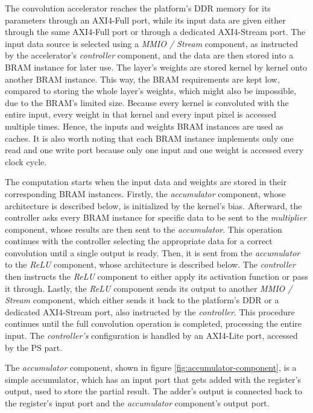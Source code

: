 The convolution accelerator reaches the platform's DDR memory for its parameters through an AXI4-Full port, while its input data are given either through the same AXI4-Full port or through a dedicated AXI4-Stream port. The input data source is selected using a \emph{MMIO / Stream} component, as instructed by the accelerator's \emph{controller} component, and the data are then stored into a BRAM instance for later use. The layer's weights are stored kernel by kernel onto another BRAM instance. This way, the BRAM requirements are kept low, compared to storing the whole layer's weights, which might also be impossible, due to the BRAM's limited size. Because every kernel is convoluted with the entire input, every weight in that kernel and every input pixel is accessed multiple times. Hence, the inputs and weights BRAM instances are used as caches. It is also worth noting that each BRAM instance implements only one read and one write port because only one input and one weight is accessed every clock cycle.

The computation starts when the input data and weights are stored in their corresponding BRAM instances. Firstly, the \emph{accumulator} component, whose architecture is described below, is initialized by the kernel's bias. Afterward, the controller asks every BRAM instance for specific data to be sent to the \emph{multiplier} component, whose results are then sent to the \emph{accumulator}. This operation continues with the controller selecting the appropriate data for a correct convolution until a single output is ready. Then, it is sent from the \emph{accumulator} to the \emph{ReLU} component, whose architecture is described below. The \emph{controller} then instructs the \emph{ReLU} component to either apply its activation function or pass it through. Lastly, the \emph{ReLU} component sends its output to another \emph{MMIO / Stream} component, which either sends it back to the platform's DDR or a dedicated AXI4-Stream port, also instructed by the \emph{controller}. This procedure continues until the full convolution operation is completed, processing the entire input. The \emph{controller's} configuration is handled by an AXI4-Lite port, accessed by the PS part.

The \emph{accumulator} component, shown in figure \ref{fig:accumulator-component}, is a simple accumulator, which has an input port that gets added with the register's output, used to store the partial result. The adder's output is connected back to the register's input port and the \emph{accumulator} component's output port.

